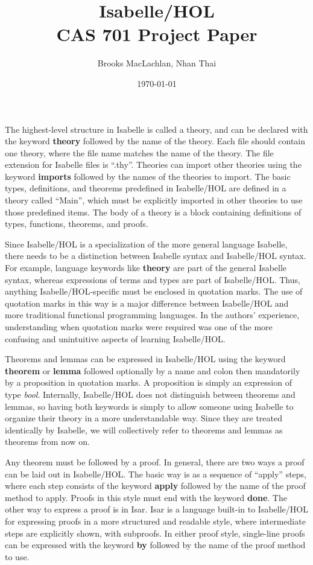 \documentclass{article}
\title{Isabelle/HOL \\ \large CAS 701 Project Paper}
\author{Brooks MacLachlan, Nhan Thai}
\date{\today}
\begin{document}
	
\maketitle

\newpage

The highest-level structure in Isabelle is called a theory, and can be declared 
with the keyword \textbf{theory} followed by the name of the theory. Each file 
should contain one theory, where the file name matches the name of the theory. 
The file extension for Isabelle files is ``.thy''. Theories can import other 
theories using the keyword \textbf{imports} followed by the names of the 
theories to import. The basic types, definitions, and theorems predefined in 
Isabelle/HOL are defined in a theory called ``Main'', which must be explicitly 
imported in other theories to use those predefined items. The body of a theory 
is a block containing definitions of types, functions, theorems, and proofs.

Since Isabelle/HOL is a specialization of the more general language Isabelle, 
there needs to be a distinction between Isabelle syntax and Isabelle/HOL 
syntax. For example, language keywords like \textbf{theory} are part of the 
general Isabelle syntax, whereas expressions of terms and types are part of 
Isabelle/HOL. Thus, anything Isabelle/HOL-specific must be enclosed in 
quotation marks. The use of quotation marks in this way is a major difference 
between Isabelle/HOL and more traditional functional programming languages. In 
the authors' experience, understanding when quotation marks were required was 
one of the more confusing and unintuitive aspects of learning Isabelle/HOL.
	
Theorems and lemmas can be expressed in Isabelle/HOL using the keyword 
\textbf{theorem} or \textbf{lemma} followed optionally by a name and colon then 
mandatorily by a proposition in quotation 
marks. A proposition is simply an expression of type \textit{bool}. Internally, 
Isabelle/HOL does not distinguish between theorems and lemmas, so having both 
keywords is simply to allow someone using Isabelle to organize their theory in 
a more understandable way. Since they are treated identically by Isabelle, we 
will collectively refer to theorems and lemmas as theorems from now on.

Any theorem must be followed by a proof. In general, there are two ways a proof 
can be laid out in Isabelle/HOL. The basic way is as a sequence of ``apply'' 
steps, where each step consists of the keyword \textbf{apply} followed by the 
name of the proof method to apply. Proofs in this style must end with the 
keyword \textbf{done}. The other way to express a proof is in Isar. Isar is a 
language built-in to Isabelle/HOL for expressing proofs in a more structured 
and readable style, where intermediate steps are explicitly shown, with 
subproofs. In either proof style, single-line proofs can be expressed with the 
keyword \textbf{by} followed by the name of the proof method to use.
\end{document}
